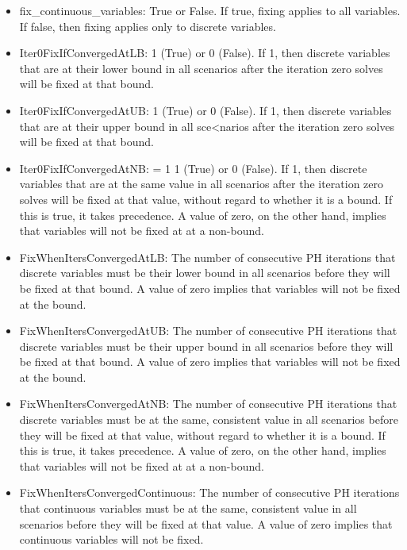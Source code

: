 \begin{itemize}
  \item fix\_continuous\_variables: True or False. If true, fixing applies to
  all variables. If false, then fixing applies only to discrete variables.

  \item Iter0FixIfConvergedAtLB: 1 (True) or 0 (False). If 1, then discrete
  variables that are at their lower bound in all scenarios after the iteration
  zero solves will be fixed at that bound.

  \item Iter0FixIfConvergedAtUB: 1 (True) or 0 (False). If 1, then discrete
  variables that are at their upper bound in all sce<narios after the iteration
  zero solves will be fixed at that bound.

  \item Iter0FixIfConvergedAtNB: = 1 1 (True) or 0 (False). If 1, then discrete
  variables that are at the same value in all scenarios after the iteration zero
  solves will be fixed at that value, without regard to whether it is a bound.
  If this is true, it takes precedence. A value of zero, on the other hand,
  implies that variables will not be fixed at at a non-bound.

  \item FixWhenItersConvergedAtLB: The number of consecutive PH iterations that
  discrete variables must be their lower bound in all scenarios before they will
  be fixed at that bound. A value of zero implies that variables will not be
  fixed at the bound.

  \item FixWhenItersConvergedAtUB: The number of consecutive PH iterations that
  discrete variables must be their upper bound in all scenarios before they will
  be fixed at that bound. A value of zero implies that variables will not be
  fixed at the bound.

  \item FixWhenItersConvergedAtNB: The number of consecutive PH iterations that
  discrete variables must be at the same, consistent value in all scenarios
  before they will be fixed at that value, without regard to whether it is a
  bound. If this is true, it takes precedence. A value of zero, on the other
  hand, implies that variables will not be fixed at at a non-bound.

  \item FixWhenItersConvergedContinuous: The number of consecutive PH iterations
  that continuous variables must be at the same, consistent value in all
  scenarios before they will be fixed at that value. A value of zero implies
  that continuous variables will not be fixed.


\end{itemize}
